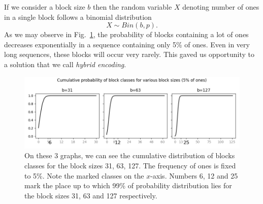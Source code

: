 If we consider a block size $b$ then the random variable $X$ denoting number of ones in
a single block follows a binomial distribution $$X \sim Bin(b,p).$$ As we may observe in
Fig.~\ref{obr:hybridEncodingDistribution}, the probability of blocks
containing a lot of ones decreases exponentially in a sequence containing only 5\% of ones.
Even in very long sequences, these blocks will occur very rarely. This gaved us
opportunity to a solution that we call \textit{hybrid encoding}.

\begin{figure}
	\centerline{
		\includegraphics[width=\textwidth]{images/hybrid_encoding_motivation}
	}
	\caption[TODO]{On these 3 graphs, we can see the cumulative distribution
    of blocks classes for the block sizes 31, 63, 127. The frequency of ones is
    fixed to 5\%. Note the marked classes on the $x$-axis. Numbers 6, 12 and
    25 mark the place up to which 99\% of probability distribution lies for
    the block sizes 31, 63 and 127 respectively.
	}
	\label{obr:hybridEncodingDistribution}
\end{figure}

